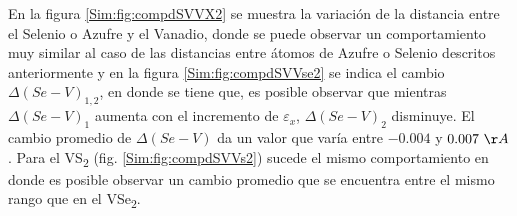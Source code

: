 \par En la figura \ref{Sim:fig:compdSVVX2} se muestra la variaci\'on de la distancia entre el Selenio o Azufre  y el Vanadio, donde se puede observar un comportamiento muy similar al  caso de las distancias entre \'atomos de Azufre o Selenio descritos anteriormente y en la figura \ref{Sim:fig:compdSVVse2} se indica el cambio $\Delta (Se-V)_{1,2}$, en donde se tiene que, es posible observar que  mientras  $\Delta (Se-V)_{1}$ aumenta con el incremento de $\varepsilon_x$, $\Delta (Se-V)_{2}$ disminuye. El cambio promedio de $\Delta (Se-V)$ da un valor que var\'ia entre $-0.004$ y $0.007 ~\AA$.  Para el VS\textsubscript{2} (fig. \ref{Sim:fig:compdSVVs2})
sucede el mismo comportamiento  en donde es posible observar un cambio promedio que se encuentra entre el mismo rango que en el VSe\textsubscript{2}.
